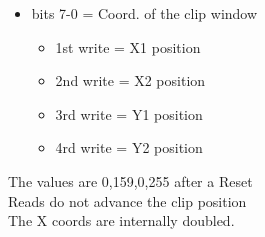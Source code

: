 \begin{itemize}
\item bits 7-0 = Coord. of the clip window
  \begin{itemize}
  \item[] 1st write = X1 position
  \item[] 2nd write = X2 position
  \item[] 3rd write = Y1 position
  \item[] 4rd write = Y2 position
  \end{itemize}
\end{itemize}
The values are 0,159,0,255 after a Reset\\
Reads do not advance the clip position\\
The X coords are internally doubled.

